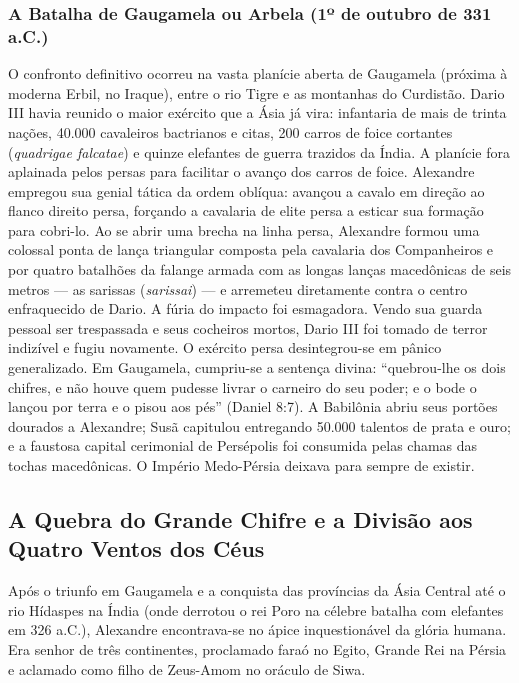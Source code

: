 \subsubsection*{A Batalha de Gaugamela ou Arbela (1º de outubro de 331 a.C.)}
O confronto definitivo ocorreu na vasta planície aberta de Gaugamela (próxima à moderna Erbil, no Iraque), entre o rio Tigre e as montanhas do Curdistão. Dario III havia reunido o maior exército que a Ásia já vira: infantaria de mais de trinta nações, 40.000 cavaleiros bactrianos e citas, 200 carros de foice cortantes (\textit{quadrigae falcatae}) e quinze elefantes de guerra trazidos da Índia. A planície fora aplainada pelos persas para facilitar o avanço dos carros de foice.
Alexandre empregou sua genial tática da ordem oblíqua: avançou a cavalo em direção ao flanco direito persa, forçando a cavalaria de elite persa a esticar sua formação para cobri-lo. Ao se abrir uma brecha na linha persa, Alexandre formou uma colossal ponta de lança triangular composta pela cavalaria dos Companheiros e por quatro batalhões da falange armada com as longas lanças macedônicas de seis metros — as sarissas (\textit{sarissai}) — e arremeteu diretamente contra o centro enfraquecido de Dario. A fúria do impacto foi esmagadora. Vendo sua guarda pessoal ser trespassada e seus cocheiros mortos, Dario III foi tomado de terror indizível e fugiu novamente. O exército persa desintegrou-se em pânico generalizado. Em Gaugamela, cumpriu-se a sentença divina: ``quebrou-lhe os dois chifres, e não houve quem pudesse livrar o carneiro do seu poder; e o bode o lançou por terra e o pisou aos pés'' (Daniel 8:7). A Babilônia abriu seus portões dourados a Alexandre; Susã capitulou entregando 50.000 talentos de prata e ouro; e a faustosa capital cerimonial de Persépolis foi consumida pelas chamas das tochas macedônicas. O Império Medo-Pérsia deixava para sempre de existir.


\subsection{A Quebra do Grande Chifre e a Divisão aos Quatro Ventos dos Céus}


Após o triunfo em Gaugamela e a conquista das províncias da Ásia Central até o rio Hídaspes na Índia (onde derrotou o rei Poro na célebre batalha com elefantes em 326 a.C.), Alexandre encontrava-se no ápice inquestionável da glória humana. Era senhor de três continentes, proclamado faraó no Egito, Grande Rei na Pérsia e aclamado como filho de Zeus-Amom no oráculo de Siwa.

